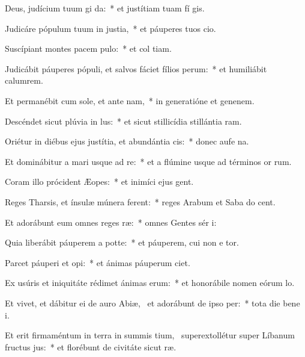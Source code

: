 \item Deus, judícium tuum gi da:~* et justítiam tuam fí gis.
\item Judicáre pópulum tuum in justia,~* et páuperes tuos  cio.
\item Suscípiant montes pacem pulo:~* et col tiam.
\item Judicábit páuperes pópuli, et salvos fáciet fílios perum:~* et humiliábit calumrem.
\item Et permanébit cum sole, et ante nam,~* in generatióne et genenem.
\item Descéndet sicut plúvia in lus:~* et sicut stillicídia stillántia  ram.
\item Oriétur in diébus ejus justítia, et abundántia cis:~* donec aufe na.
\item Et dominábitur a mari usque ad re:~* et a flúmine usque ad términos or rum.
\item Coram illo prócident Æopes:~* et inimíci ejus  gent.
\item Reges Tharsis, et ínsulæ múnera ferent:~* reges Arabum et Saba do cent.
\item Et adorábunt eum omnes reges ræ:~* omnes Gentes sér i:
\item Quia liberábit páuperem a potte:~* et páuperem, cui non e tor.
\item Parcet páuperi et opi:~* et ánimas páuperum  ciet.
\item Ex usúris et iniquitáte rédimet ánimas erum:~* et honorábile nomen eórum  lo.
\item Et vivet, et dábitur ei de auro Abiæ,~\pscross{} et adorábunt de ipso per:~* tota die bene i.
\item Et erit firmaméntum in terra in summis tium,~\pscross{} superextollétur super Líbanum fructus jus:~* et florébunt de civitáte sicut  ræ.
